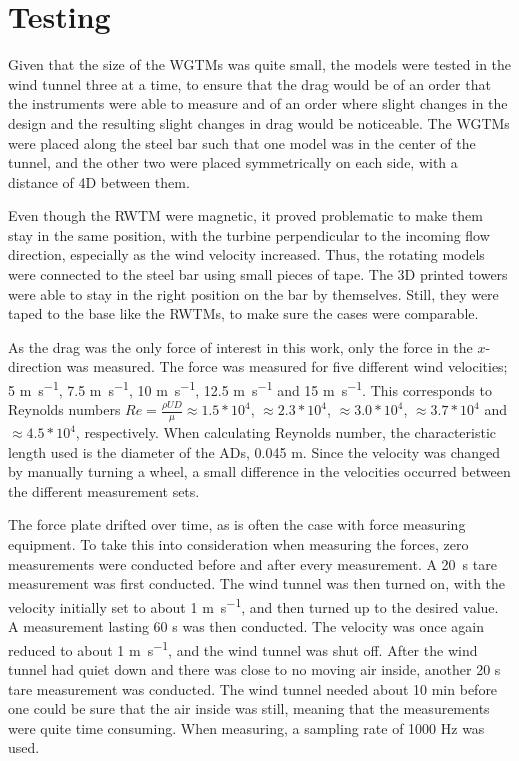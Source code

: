 \section{Testing}
Given that the size of the \gls{WGTM}s was quite small, the models were tested in the wind tunnel three at a time, to ensure that the drag would be of an order that the instruments were able to measure and of an order where slight changes in the design and the resulting slight changes in drag would be noticeable. The \gls{WGTM}s were placed  along the steel bar such that one model was in the center of the tunnel, and the other two were placed symmetrically on each side, with a distance of 4D between them.  %

Even though the \gls{RWTM} were magnetic, it proved problematic to make them stay in the same position, with the turbine perpendicular to the incoming flow direction, especially as the wind velocity increased. Thus, the rotating models were connected to the steel bar using small pieces of tape. The 3D printed towers were able to stay in the right position on the bar by themselves. Still, they were taped to the base like the \gls{RWTM}s, to make sure the cases were comparable. 

As the drag was the only force of interest in this work, only the force in the $x$-direction was measured. The force was measured for five different wind velocities; 5 \si{\m\per\s}, 7.5 \si{\m\per\s}, 10 \si{\m\per\s}, 12.5 \si{\m\per\s} and 15 \si{\m\per\s}. This corresponds to Reynolds numbers $Re = \frac{\rho U D}{\mu} \approx 1.5*10^4$, $\approx 2.3*10^4$, $ \approx 3.0*10^4$, $\approx 3.7*10^4$ and $\approx 4.5*10^4$, respectively. When calculating Reynolds number, the characteristic length used is the diameter of the \gls{AD}s, 0.045 \si{\m}. Since the velocity was changed by manually turning a wheel, a small difference in the velocities occurred between the different measurement sets. 

The force plate drifted over time, as is often the case with force measuring equipment. To take this into consideration when measuring the forces, zero measurements were conducted before and after every measurement. A 20~\si{\s} tare measurement was first conducted. The wind tunnel was then turned on, with the velocity initially set to about 1 \si{\m\per\s}, and then turned up to the desired value. A measurement lasting 60 \si{s} was then conducted. The velocity was once again reduced to about 1 \si{\m\per\s}, and the wind tunnel was shut off. After the wind tunnel had quiet down and there was close to no moving air inside, another 20 \si{\s} tare measurement was conducted. The wind tunnel needed about 10 \si{\minute} before one could be sure that the air inside was still, meaning that the measurements were quite time consuming. When measuring, a sampling rate of 1000 \si{\hertz} was used.  

